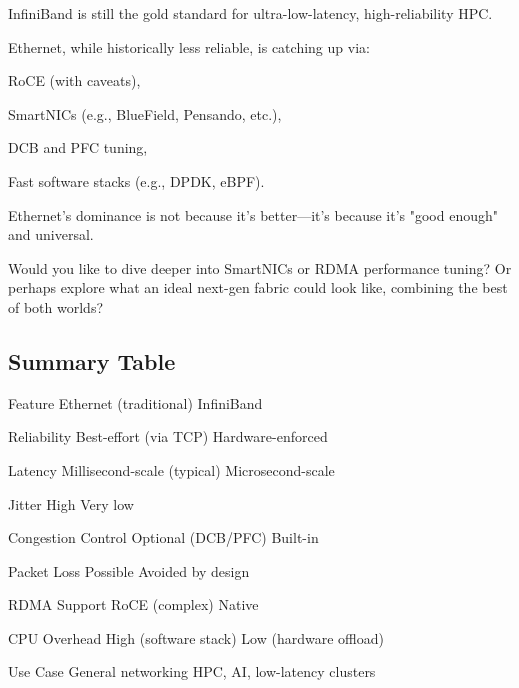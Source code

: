 \documentclass[../../../OAE-SPEC-MAIN.tex]{subfiles}
\begin{document}
InfiniBand is still the gold standard for ultra-low-latency, high-reliability HPC.

Ethernet, while historically less reliable, is catching up via:


RoCE (with caveats),

SmartNICs (e.g., BlueField, Pensando, etc.),

DCB and PFC tuning,

Fast software stacks (e.g., DPDK, eBPF).

Ethernet’s dominance is not because it’s better—it’s because it’s "good enough" and universal.

Would you like to dive deeper into SmartNICs or RDMA performance tuning? Or perhaps explore what an ideal next-gen fabric could look like, combining the best of both worlds?
 


 
\subsection{Summary Table}
 
Feature	Ethernet (traditional)	InfiniBand

Reliability	Best-effort (via TCP)	Hardware-enforced

Latency	Millisecond-scale (typical)	Microsecond-scale

Jitter	High	Very low

Congestion Control	Optional (DCB/PFC)	Built-in

Packet Loss	Possible	Avoided by design

RDMA Support	RoCE (complex)	Native

CPU Overhead	High (software stack)	Low (hardware offload)

Use Case	General networking	HPC, AI, low-latency clusters
\end{document}
